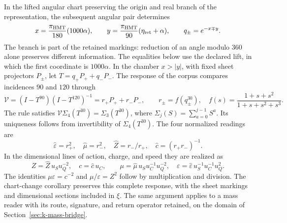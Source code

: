 In the lifted angular chart preserving the origin and real branch
of the representation, the subsequent angular pair determines
\[
 x=\frac{\pi_{\rm HMT}}{180}(1000\alpha),\qquad
 y=\frac{\pi_{\rm HMT}}{90}(\eta_{\rm ret}+\alpha),\qquad
 q_\pm=e^{-x\mp y}.
\]
The branch is part of the retained markings: reduction of an angle
modulo \(360\) alone preserves different information. The equalities
below use the declared lift, in which the first
coordinate is \(1000\alpha\).
In the chamber \(x>|y|\), with fixed sheet projectors
\(P_\pm\), let \(T=q_+P_++q_-P_-\). The response of the corpus
compares incidences \(90\) and \(120\) through
\[
 \mathcal V=(I-T^{90})(I-T^{120})^{-1}
 =r_+P_++r_-P_-,\qquad
 r_\pm=f(q_\pm^{30}),\quad
 f(s)=\frac{1+s+s^2}{1+s+s^2+s^3}.
\]
The rule satisfies
\(\mathcal V\Sigma_4(T^{30})=\Sigma_3(T^{30})\), where
\(\Sigma_j(S)=\sum_{a=0}^{j-1}S^a\). Its uniqueness follows
from invertibility of \(\Sigma_4(T^{30})\).
The four normalized readings are
\[
 \widehat\varepsilon=r_+^2,\quad
 \widehat\mu=r_-^2,\quad
 \widehat Z=r_-/r_+,\quad
 \widehat c=(r_+r_-)^{-1}.
\]
In the dimensional lines of action, charge, and speed they are realized as
\[
 Z=\widehat Z\,u_Su_Q^{-2},\quad c=\widehat c\,u_C,
 \qquad
 \mu=\widehat\mu\,u_Su_C^{-1}u_Q^{-2},\quad
 \varepsilon=\widehat\varepsilon\,u_S^{-1}u_C^{-1}u_Q^2.
\]
The identities \(\mu\varepsilon=c^{-2}\) and
\(\mu/\varepsilon=Z^2\) follow by multiplication and division.
The chart-change corollary preserves this complete response,
with the sheet markings and dimensional sections included in
\(\xi\). The same argument applies to a mass reader with its
route, signature, and return operator retained, on the domain of
Section~\ref{sec:k-mass-bridge}.

